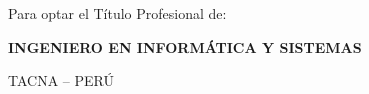 \begin{titlepage}
\begin{center}
{\fontsize{14}{20}\selectfont
Para optar el Título Profesional de:
}

\vspace*{1.5cm}

{\fontsize{14}{20}\selectfont\bfseries
INGENIERO EN INFORMÁTICA Y SISTEMAS
}

\vspace*{1.5cm}

{\fontsize{14}{20}\selectfont
TACNA -- PERÚ
}

\vspace*{0.5cm}

{\fontsize{14}{20}
}

\end{center}
\end{titlepage}
